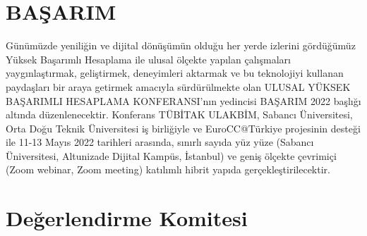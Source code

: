 \section{BAŞARIM}
Günümüzde yeniliğin ve dijital dönüşümün olduğu her yerde izlerini gördüğümüz Yüksek Başarımlı Hesaplama ile ulusal ölçekte yapılan çalışmaları yaygınlaştırmak, geliştirmek, deneyimleri aktarmak ve bu teknolojiyi kullanan paydaşları bir araya getirmek amacıyla sürdürülmekte olan ULUSAL YÜKSEK BAŞARIMLI HESAPLAMA KONFERANSI’nın yedincisi BAŞARIM 2022 başlığı altında düzenlenecektir. Konferans TÜBİTAK ULAKBİM, Sabancı Üniversitesi, Orta Doğu Teknik Üniversitesi iş birliğiyle ve EuroCC@Türkiye projesinin desteği ile 11-13 Mayıs 2022 tarihleri arasında,  sınırlı sayıda yüz yüze  (Sabancı Üniversitesi, Altunizade Dijital Kampüs, İstanbul) ve geniş ölçekte çevrimiçi (Zoom webinar, Zoom meeting) katılımlı hibrit yapıda gerçekleştirilecektir. 

\newpage
\section{Değerlendirme Komitesi}

